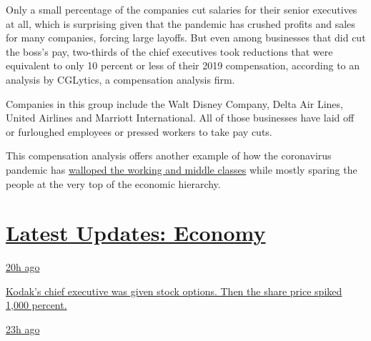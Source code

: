 Only a small percentage of the companies cut salaries for their senior
executives at all, which is surprising given that the pandemic has
crushed profits and sales for many companies, forcing large layoffs. But
even among businesses that did cut the boss's pay, two-thirds of the
chief executives took reductions that were equivalent to only 10 percent
or less of their 2019 compensation, according to an analysis by
CGLytics, a compensation analysis firm.

Companies in this group include the Walt Disney Company, Delta Air
Lines, United Airlines and Marriott International. All of those
businesses have laid off or furloughed employees or pressed workers to
take pay cuts.

This compensation analysis offers another example of how the coronavirus
pandemic has
\href{https://www.nytimes3xbfgragh.onion/2020/03/15/world/europe/coronavirus-inequality.html}{walloped
the working and middle classes} while mostly sparing the people at the
very top of the economic hierarchy.

\hypertarget{latest-updates-economy}{%
\section{\texorpdfstring{\href{https://www.nytimes3xbfgragh.onion/live/2020/07/31/business/stock-market-today-coronavirus?action=click\&pgtype=Article\&state=default\&region=MAIN_CONTENT_1\&context=storylines_live_updates}{Latest
Updates:
Economy}}{Latest Updates: Economy}}\label{latest-updates-economy}}

\href{https://www.nytimes3xbfgragh.onion/live/2020/07/31/business/stock-market-today-coronavirus?action=click\&pgtype=Article\&state=default\&region=MAIN_CONTENT_1\&context=storylines_live_updates\#kodaks-chief-executive-was-given-stock-options-then-the-share-price-spiked-1000-percent}{20h
ago}

\href{https://www.nytimes3xbfgragh.onion/live/2020/07/31/business/stock-market-today-coronavirus?action=click\&pgtype=Article\&state=default\&region=MAIN_CONTENT_1\&context=storylines_live_updates\#kodaks-chief-executive-was-given-stock-options-then-the-share-price-spiked-1000-percent}{Kodak's
chief executive was given stock options. Then the share price spiked
1,000 percent.}

\href{https://www.nytimes3xbfgragh.onion/live/2020/07/31/business/stock-market-today-coronavirus?action=click\&pgtype=Article\&state=default\&region=MAIN_CONTENT_1\&context=storylines_live_updates\#fitch-ratings-downgrades-its-outlook-on-us-debt}{23h
ago}

